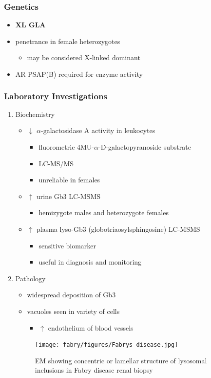 \documentclass[12pt]{scrartcl}
\begin{document}
\subsubsection{Genetics}
\label{sec:org3fb46bc}
\begin{itemize}
\item \textbf{XL GLA}
\item penetrance in female heterozygotes
\begin{itemize}
\item may be considered X-linked dominant
\end{itemize}
\item AR PSAP(B) required for enzyme activity
\end{itemize}
\subsubsection{Laboratory Investigations}
\label{sec:orgb15832d}
\begin{enumerate}
\item Biochemistry
\label{sec:orgd3dddd2}
\begin{itemize}
\item \(\downarrow\) \(\alpha\)-galactosidase A activity in leukocytes
\begin{itemize}
\item fluorometric 4MU-\(\alpha\)-D-galactopyranoside substrate
\item LC-MS/MS
\item unreliable in females
\end{itemize}
\item \(\uparrow\) urine Gb3 LC-MSMS 
\begin{itemize}
\item hemizygote males and heterozygote females
\end{itemize}
\item \(\uparrow\) plasma lyso-Gb3 (globotriaosylsphingosine) LC-MSMS
\begin{itemize}
\item sensitive biomarker
\item useful in diagnosis and monitoring
\end{itemize}
\end{itemize}

\item Pathology
\label{sec:orgfe55568}
\begin{itemize}
\item widespread deposition of Gb3
\item vacuoles seen in variety of cells
\begin{itemize}
\item \(\uparrow\) endothelium of blood vessels
\end{itemize}
\end{itemize}

\begin{figure}[htbp]
\centering
\texttt{[image: fabry/figures/Fabrys-disease.jpg]}
\caption[Fabry EM]{\label{fig:org6bf90a0}EM showing concentric or lamellar structure of lysosomal inclusions in Fabry disease renal biopsy}
\end{figure}
\end{enumerate}
\end{document}

